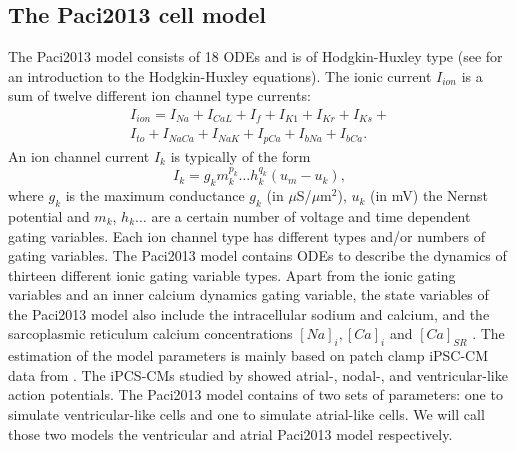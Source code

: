 \documentclass[12pt,a4paper]{article}
\begin{document}
\subsection{The Paci2013 cell model} \label{The Paci2013 cell model}
The Paci2013 model consists of 18 ODEs and is of Hodgkin-Huxley type (see \cite[p. 195-215]{KeenerI} for an introduction to the Hodgkin-Huxley equations). The ionic current $I_{ion}$ is a sum of twelve different ion channel type currents:
\begin{eqnarray}
I_{ion}=I_{Na}+I_{CaL}+I_f+I_{K1}+I_{Kr}+I_{Ks}+ \\
I_{to}+I_{NaCa}+I_{NaK}+I_{pCa}+I_{bNa}+I_{bCa}.
\end{eqnarray}
An ion channel current $I_k$ is typically of the form 
\begin{equation}
I_{k}=g_k m_k^{p_k}\ldots h_k^{q_k}(u_m-u_k),
\end{equation}
where $g_k$ is the maximum conductance $g_k$ (in $\mu$S/$\mu$m$^2$), $u_k$ (in mV) the Nernst potential and $m_k$, $h_k \ldots$ are a certain number of voltage and time dependent gating variables. Each ion channel type has different types and/or numbers of gating variables. The Paci2013 model contains ODEs to describe the dynamics of thirteen different ionic gating variable types. Apart from the ionic gating variables and an inner calcium dynamics gating variable, the state variables of the Paci2013 model also include the intracellular sodium and calcium, and the sarcoplasmic reticulum calcium concentrations $[Na]_i, [Ca]_i$ and $[Ca]_{SR}$ \cite{Paci2013}. The estimation of the model parameters is mainly based on patch clamp iPSC-CM data from \cite{Ma2011}. The iPCS-CMs studied by \cite{Ma2011} showed atrial-, nodal-, and ventricular-like action potentials. The Paci2013 model contains of two sets of parameters: one to simulate ventricular-like cells and one to simulate atrial-like cells. We will call those two models the ventricular and atrial Paci2013 model respectively.
%
\end{document}
